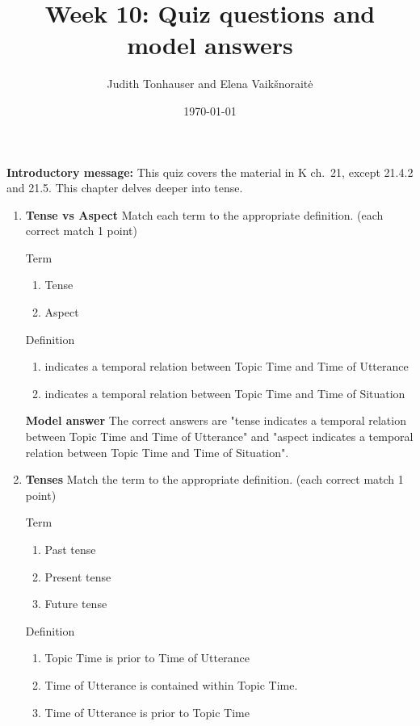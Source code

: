 \documentclass[a4,11pt]{article}
\title{Week 10: Quiz questions and model answers}
\author{Judith Tonhauser and Elena Vaik\v snorait\.{e} }
\date{\today}
\newcommand{\6}{\mbox{$[\hspace*{-.6mm}[$}}
\newcommand{\9}{\mbox{$]\hspace*{-.6mm}]$}}
\begin{document}
\maketitle

{\bf Introductory message:} This quiz covers the material in K ch.\ 21, except 21.4.2 and 21.5. This chapter delves deeper into tense. 

\begin{enumerate}[leftmargin = 12pt]

\item {\bf Tense vs Aspect} Match each term to the appropriate definition. (each correct match 1 point)

Term
\begin{enumerate}[noitemsep]
\item Tense
\item Aspect
\end{enumerate}

Definition

\begin{enumerate}[noitemsep]
\item indicates a temporal relation between Topic Time and Time of Utterance
\item indicates a temporal relation between Topic Time and Time of Situation
\end{enumerate}

{\bf Model answer} The correct answers are "tense indicates a temporal relation between Topic Time and Time of Utterance" and "aspect indicates a temporal relation between Topic Time and Time of Situation".

\item  {\bf Tenses} Match the term to the appropriate definition. (each correct match 1 point)

Term

\begin{enumerate}[noitemsep]
\item Past tense 
\item Present tense 
\item Future tense
\end{enumerate}

Definition

\begin{enumerate}[noitemsep]
\item Topic Time is prior to Time of Utterance
\item Time of Utterance  is contained within Topic Time.
\item Time of Utterance is prior to Topic Time 
\end{enumerate}


\end{enumerate}
\end{document}

